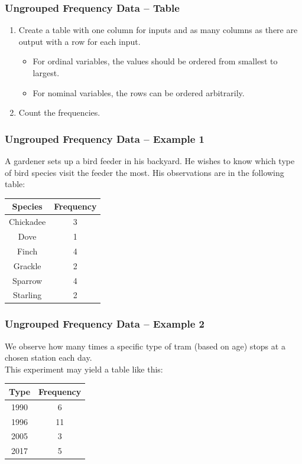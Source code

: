 \documentclass[aspectratio=169,11pt,svgnames]{beamer}
\begin{document}
\begin{frame}
 \frametitle{Ungrouped Frequency Data -- Table}
 \begin{enumerate}
  \item Create a table with one column for inputs and as many columns as there
   are output with a row for each input.
   \pause
   \begin{itemize}
    \item For \alert{ordinal} variables, the values should be ordered from
     smallest to largest.
    \pause
    \item For \alert{nominal} variables, the rows can be ordered arbitrarily.
   \end{itemize}
  \item Count the \alert{frequencies}.
 \end{enumerate}
\end{frame}

\begin{frame}
 \frametitle{Ungrouped Frequency Data -- Example 1}
 A gardener sets up a bird feeder in his backyard. He wishes to know which type
 of bird species visit the feeder the most.
 \pause
 His observations are in the following table:
 \begin{center}
  \begin{tabular}{c|c}
   \textbf{Species} & \textbf{Frequency}\\
   \toprule
   Chickadee & 3\\
   Dove & 1\\
   Finch & 4\\
   Grackle & 2\\
   Sparrow & 4\\
   Starling & 2
  \end{tabular}
 \end{center}
\end{frame}

\begin{frame}
 \frametitle{Ungrouped Frequency Data -- Example 2}
 We observe how many times a specific type of tram (based on age) stops at a
 chosen station each day.\\
 \pause
 This experiment may yield a table like this:
 \begin{center}
  \begin{tabular}{c|c}
   \textbf{Type} & \textbf{Frequency}\\
   \toprule
   1990 & 6\\
   1996 & 11\\
   2005 & 3\\
   2017 & 5
  \end{tabular}
 \end{center}
\end{frame}
\end{document}
